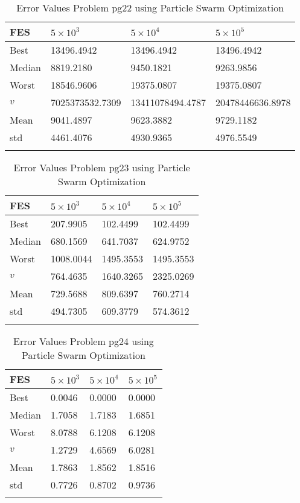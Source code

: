 \documentclass[10pt, a4paper]{book}
\begin{document}
\begin{center}
\begin{longtable}{l l l l}
FES & $5 \times 10^{3}$ & $5 \times 10^{4}$ & $5 \times 10^{5}$ \\
\hline
Best & 13496.4942 & 13496.4942 & 13496.4942 \\
Median & 8819.2180 & 9450.1821 & 9263.9856 \\
Worst & 18546.9606 & 19375.0807 & 19375.0807 \\
$v$ & 7025373532.7309 & 13411078494.4787 & 20478446636.8978 \\
Mean & 9041.4897 & 9623.3882 & 9729.1182 \\
std & 4461.4076 & 4930.9365 & 4976.5549 \\
\caption{ Error Values Problem pg22 using Particle Swarm Optimization }
\end{longtable}
\end{center}

\begin{center}
\begin{longtable}{l l l l}
FES & $5 \times 10^{3}$ & $5 \times 10^{4}$ & $5 \times 10^{5}$ \\
\hline
Best & 207.9905 & 102.4499 & 102.4499 \\
Median & 680.1569 & 641.7037 & 624.9752 \\
Worst & 1008.0044 & 1495.3553 & 1495.3553 \\
$v$ & 764.4635 & 1640.3265 & 2325.0269 \\
Mean & 729.5688 & 809.6397 & 760.2714 \\
std & 494.7305 & 609.3779 & 574.3612 \\
\caption{ Error Values Problem pg23 using Particle Swarm Optimization }
\end{longtable}
\end{center}

\begin{center}
\begin{longtable}{l l l l}
FES & $5 \times 10^{3}$ & $5 \times 10^{4}$ & $5 \times 10^{5}$ \\
\hline
Best & 0.0046 & 0.0000 & 0.0000 \\
Median & 1.7058 & 1.7183 & 1.6851 \\
Worst & 8.0788 & 6.1208 & 6.1208 \\
$v$ & 1.2729 & 4.6569 & 6.0281 \\
Mean & 1.7863 & 1.8562 & 1.8516 \\
std & 0.7726 & 0.8702 & 0.9736 \\
\caption{ Error Values Problem pg24 using Particle Swarm Optimization }
\end{longtable}
\end{center}
\end{document}
